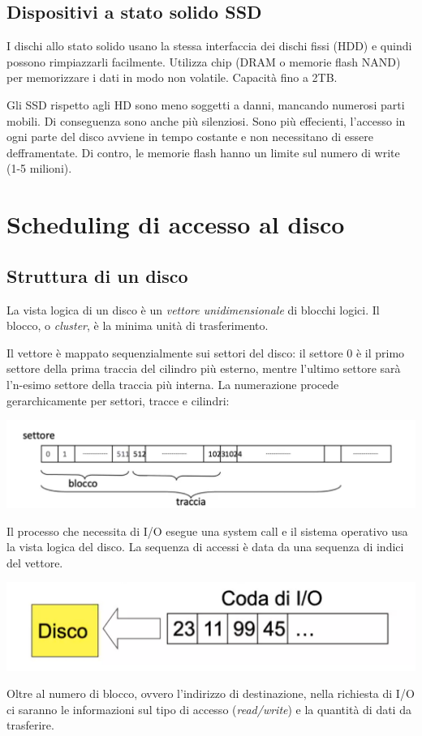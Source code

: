 \documentclass[a4paper,12pt, twoside]{report}
\begin{document}
\subsection{Dispositivi a stato solido SSD}

I dischi allo stato solido usano la stessa interfaccia dei dischi fissi (HDD) e quindi possono rimpiazzarli
facilmente. Utilizza chip (DRAM o memorie flash NAND) per memorizzare i dati in modo non volatile. Capacit\`a
fino a 2TB.

Gli SSD rispetto agli HD sono meno soggetti a danni, mancando numerosi parti mobili. Di conseguenza sono 
anche pi\`u silenziosi. Sono pi\`u effecienti, l'accesso in ogni parte del disco avviene in tempo costante e
non necessitano di essere defframentate. Di contro, le memorie flash hanno un limite sul numero di write (1-5 milioni).

\section{Scheduling di accesso al disco}

\subsection{Struttura di un disco}
La vista logica di un disco \`e un \emph{vettore unidimensionale} di blocchi logici. Il blocco, o \emph{cluster}, 
\`e la minima unit\`a di trasferimento. 

Il vettore \`e mappato sequenzialmente sui settori del disco: il settore 0 \`e il primo settore della prima traccia
del cilindro pi\`u esterno, mentre l'ultimo settore sar\`a l'n-esimo settore della traccia pi\`u interna. 
La numerazione procede gerarchicamente per settori, tracce e cilindri:
\begin{center}
    \includegraphics[scale=0.2]{disk_logic}
\end{center}
Il processo che necessita di I/O esegue una system call e il sistema operativo usa la vista logica del disco. La
sequenza di accessi \`e data da una sequenza di indici del vettore.
\begin{center}
    \includegraphics[scale=0.15]{io_queue}
\end{center}
Oltre al numero di blocco, ovvero l'indirizzo di destinazione, nella richiesta di I/O ci saranno le informazioni sul tipo 
di accesso (\emph{read/write}) e la quantit\`a di dati da trasferire. 
\end{document}
